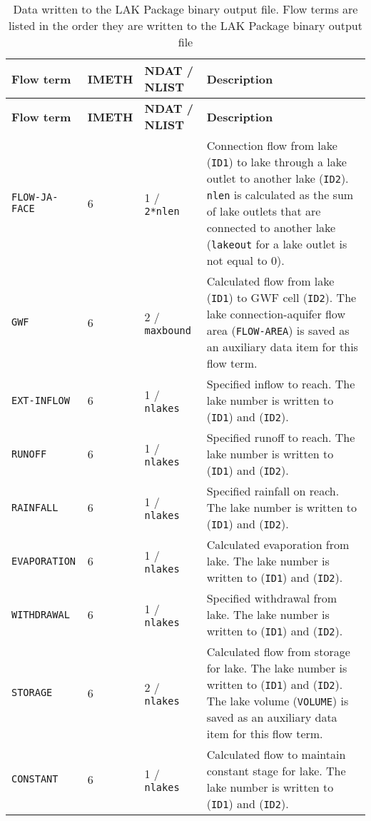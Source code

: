 \begin{longtable}{p{3.5cm} p{2cm} p{3.5cm} p{6.5cm}}
\caption{Data written to the LAK Package binary output file. Flow terms are listed in the order they are written to the LAK Package binary output file} \tabularnewline
\hline
\hline
\textbf{Flow term} & \textbf{IMETH} & \textbf{NDAT / NLIST} & \textbf{Description} \\
\hline
\endfirsthead

\hline
\hline
\textbf{Flow term} & \textbf{IMETH} & \textbf{NDAT / NLIST} & \textbf{Description} \\
\hline
\endhead

\hline
\endfoot

\texttt{FLOW-JA-FACE} & 6 & 1 / \texttt{2*nlen} & Connection flow from lake (\texttt{ID1}) to lake through a lake outlet to another lake (\texttt{ID2}). \texttt{nlen} is calculated as the sum of lake outlets that are connected to another lake (\texttt{lakeout} for a lake outlet is not equal to 0). \\
\texttt{GWF} & 6 & 2 / \texttt{maxbound} & Calculated flow from lake (\texttt{ID1}) to GWF cell (\texttt{ID2}). The lake connection-aquifer flow area (\texttt{FLOW-AREA}) is saved as an auxiliary data item for this flow term. \\
\texttt{EXT-INFLOW} & 6 & 1 / \texttt{nlakes} & Specified inflow to reach. The lake number is written to (\texttt{ID1}) and (\texttt{ID2}). \\
\texttt{RUNOFF} & 6 & 1 / \texttt{nlakes} & Specified runoff to reach. The lake number is written to (\texttt{ID1}) and (\texttt{ID2}). \\
\texttt{RAINFALL} & 6 & 1 / \texttt{nlakes} & Specified rainfall on reach. The lake number is written to (\texttt{ID1}) and (\texttt{ID2}). \\
\texttt{EVAPORATION} & 6 & 1 / \texttt{nlakes} & Calculated evaporation from lake. The lake number is written to (\texttt{ID1}) and (\texttt{ID2}). \\
\texttt{WITHDRAWAL} & 6 & 1 / \texttt{nlakes} & Specified withdrawal from lake. The lake number is written to (\texttt{ID1}) and (\texttt{ID2}). \\
\texttt{STORAGE} & 6 & 2 / \texttt{nlakes} & Calculated flow from storage for lake. The lake number is written to (\texttt{ID1}) and (\texttt{ID2}). The lake volume (\texttt{VOLUME}) is saved as an auxiliary data item for this flow term. \\
\texttt{CONSTANT} & 6 & 1 / \texttt{nlakes} & Calculated flow to maintain constant stage for lake. The lake number is written to (\texttt{ID1}) and (\texttt{ID2}). \\

\end{longtable}
